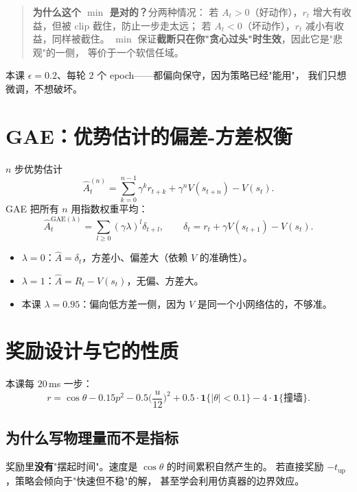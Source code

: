 \begin{quote}
\textbf{为什么这个 $\min$ 是对的？}分两种情况：
若 $A_t>0$（好动作），$r_t$ 增大有收益，但被 $\mathrm{clip}$ 截住，防止一步走太远；
若 $A_t<0$（坏动作），$r_t$ 减小有收益，同样被截住。
$\min$ 保证\textbf{截断只在你"贪心过头"时生效}，因此它是"悲观"的一侧，
等价于一个软信任域。
\end{quote}

本课 $\epsilon=0.2$、每轮 $2$ 个 epoch——都偏向保守，因为策略已经"能用"，
我们只想微调，不想破坏。

\section{GAE：优势估计的偏差-方差权衡}

$n$ 步优势估计
\begin{equation}
  \hat A_t^{(n)}=\sum_{k=0}^{n-1}\gamma^k r_{t+k}+\gamma^n V(s_{t+n})-V(s_t).
\end{equation}
GAE 把所有 $n$ 用指数权重平均：
\begin{equation}
  \hat A^{\text{GAE}(\lambda)}_t=\sum_{l\ge0}(\gamma\lambda)^l\delta_{t+l},
  \qquad \delta_t=r_t+\gamma V(s_{t+1})-V(s_t).
\end{equation}
\begin{itemize}[leftmargin=2em,itemsep=2pt]
  \item $\lambda=0$：$\hat A=\delta_t$，方差小、偏差大（依赖 $V$ 的准确性）。
  \item $\lambda=1$：$\hat A=R_t-V(s_t)$，无偏、方差大。
  \item 本课 $\lambda=0.95$：偏向低方差一侧，因为 $V$ 是同一个小网络估的，不够准。
\end{itemize}

\section{奖励设计与它的性质}

本课每 $20$\,ms 一步：
\begin{equation}
  r=\cos\theta-0.15p^2-0.5\Big(\frac{u}{12}\Big)^2+0.5\cdot\mathbf 1\{|\theta|<0.1\}
    -4\cdot\mathbf 1\{\text{撞墙}\}.
\end{equation}

\subsection{为什么写物理量而不是指标}

奖励里\textbf{没有}"摆起时间"。速度是 $\cos\theta$ 的时间累积自然产生的。
若直接奖励 $-t_{\text{up}}$，策略会倾向于"快速但不稳"的解，
甚至学会利用仿真器的边界效应。

